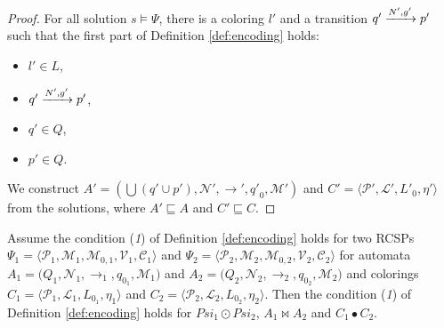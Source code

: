 \begin{proof}
For all solution $s \vDash \Psi$, there is a coloring $l'$ and a transition $q'\xrightarrow{N', g'}p'$ such that the first part of Definition \ref{def:encoding} holds:

  \begin{itemize}
  \item $l' \in L$, \item  $q'\xrightarrow{N', g'}p'$, \item  $q' \in Q$,  \item $p' \in Q$.  
  \end{itemize}

 We construct $A'=\left(\bigcup \left(q' \cup p'\right), \mathcal{N}', \rightarrow', {q'}_0, \mathcal{M}' \right)$ and $C' = \langle \mathcal{P}', \mathcal{L}', {L'}_0, \eta' \rangle$ from the solutions, where 
$A' \sqsubseteq A$ and $C' \sqsubseteq C$.
\end{proof}

\begin{lemma} %
\label{lem:com1}
Assume the condition (\textit{1}) of Definition \ref{def:encoding} holds for two RCSPs  $\Psi_1 = \langle \mathcal{P}_1, \mathcal{M}_1, \mathcal{M}_{0,1}, \mathcal{V}_1, \mathcal{C}_1 \rangle$ and
 $\Psi_2 = \langle \mathcal{P}_2, \mathcal{M}_2, \mathcal{M}_{0,2}, \mathcal{V}_2, \mathcal{C}_2 \rangle$
 for automata $A_{1} = (Q_{1}, \mathcal{N}_{1}, \rightarrow_{1},$$ q_{0_{1}}, \mathcal{M}_{1})$ and  $A_{2} = (Q_{2}, \mathcal{N}_{2}, \rightarrow_{2},$$ q_{0_{2}}, \mathcal{M}_{2})$ and colorings $C_{1} = \langle \mathcal{P}_{1}, \mathcal{L}_{1}, L_{0_1}, \eta_{1} \rangle$ and $C_{2} = \langle \mathcal{P}_{2}, \mathcal{L}_{2}, L_{0_2}, \eta_{2} \rangle$. Then the condition (\textit{1}) of Definition \ref{def:encoding} holds for $Psi_1 \odot Psi_2$, $A_1 \bowtie A_2$ and $C_1 \bullet C_2$. 
\end{lemma}

